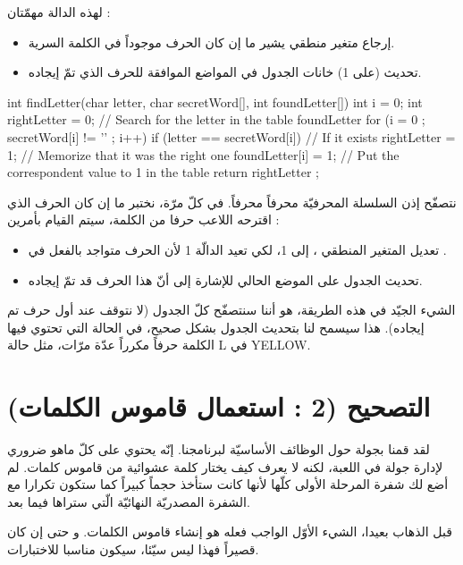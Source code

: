 لهذه الدالة مهمّتان :

\begin{itemize}
  \item إرجاع متغير منطقي يشير ما إن كان الحرف موجوداً في الكلمة السرية.
  \item تحديث (على 1) خانات الجدول
في المواضع الموافقة للحرف الذي تمّ إيجاده.
\end{itemize}

\begin{Csource}
int findLetter(char letter, char secretWord[], int foundLetter[])
{
  int i = 0;
  int rightLetter = 0;
  // Search for the letter in the table foundLetter
  for (i = 0 ; secretWord[i] != '\0' ; i++)
  {
    if (letter == secretWord[i]) // If it exists
    {
      rightLetter = 1; // Memorize that it was the right one
      foundLetter[i] = 1; // Put the correspondent value to 1 in the table
    }
  }
  return rightLetter ;
}
\end{Csource}

نتصفّح إذن السلسلة المحرفيّة
محرفاً محرفاً. في كلّ مرّة، نختبر ما إن كان الحرف الذي اقترحه اللاعب حرفا من الكلمة، سيتم القيام بأمرين :
\begin{itemize}
  \item تعديل المتغير المنطقي
،
إلى  1، لكي تعيد الدالّة 1 لأن الحرف متواجد بالفعل في
.
  \item تحديث الجدول
على الموضع الحالي للإشارة إلى أنّ هذا الحرف قد تمّ إيجاده.
\end{itemize}

الشيء الجيّد في هذه الطريقة، هو أننا سنتصفّح كلّ الجدول (لا نتوقف عند أول حرف تم إيجاده). هذا سيسمح لنا بتحديث الجدول
بشكل صحيح، في الحالة التي تحتوي فيها الكلمة حرفاً مكرراً عدّة مرّات، مثل حالة
\textenglish{L}
في
\textenglish{YELLOW}.

\section{التصحيح (2 : استعمال قاموس الكلمات)}
لقد قمنا بجولة حول الوظائف الأساسيّة لبرنامجنا. إنّه يحتوي على كلّ ماهو ضروري لإدارة جولة في اللعبة، لكنه لا يعرف كيف يختار كلمة عشوائية من قاموس كلمات. لم أضع لك شفرة المرحلة الأولى كلّها لأنها كانت ستأخذ حجماً كبيراً كما ستكون تكرارا مع الشفرة المصدريّة النهائيّة الّتي ستراها فيما بعد.

قبل الذهاب بعيدا، الشيء الأوّل الواجب فعله هو إنشاء قاموس الكلمات. و حتى إن كان قصيراً فهذا ليس سيّئا، سيكون مناسبا للاختبارات.

